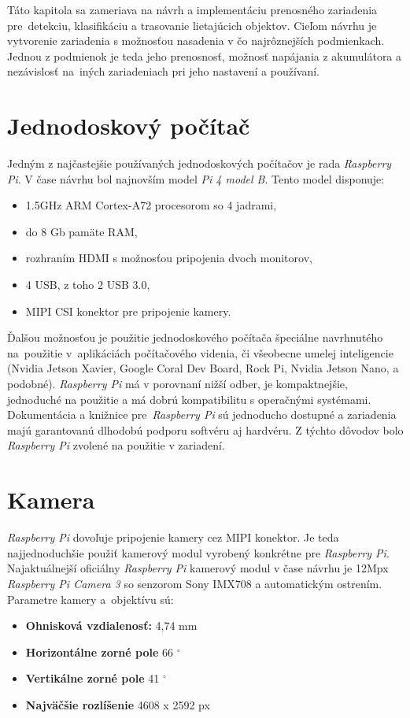     Táto kapitola sa zameriava na návrh a implementáciu prenosného zariadenia pre~detekciu, klasifikáciu a trasovanie lietajúcich objektov. Cieľom návrhu je vytvorenie zariadenia s možnosťou nasadenia v čo najrôznejších podmienkach. Jednou z podmienok je teda jeho prenosnosť, možnosť napájania z akumulátora a nezávislosť na~iných zariadeniach pri jeho nastavení a používaní.

    \section{Jednodoskový počítač}
    
        Jedným z najčastejšie používaných jednodoskových počítačov je rada \emph{Raspberry Pi}. V čase návrhu bol najnovším model \emph{Pi 4 model B}. Tento model disponuje:
        \begin{itemize}
            \item 1.5GHz ARM Cortex-A72 procesorom so 4 jadrami,
            \item do 8 Gb pamäte RAM,
            \item rozhraním HDMI s možnosťou pripojenia dvoch monitorov,
            \item 4 USB, z toho 2 USB 3.0,
            \item MIPI CSI konektor pre pripojenie kamery.
        \end{itemize}

        Ďalšou možnosťou je použitie jednodoskového počítača špeciálne navrhnutého na~použitie v~aplikáciách počítačového videnia, či všeobecne umelej inteligencie (Nvidia Jetson Xavier, Google Coral Dev Board, Rock Pi, Nvidia Jetson Nano, a podobné). \emph{Raspberry Pi} má v porovnaní nižší odber, je kompaktnejšie, jednoduché na použitie a má dobrú kompatibilitu s operačnými systémami. Dokumentácia a knižnice pre~\emph{Raspberry Pi} sú jednoducho dostupné a zariadenia majú garantovanú dlhodobú podporu softvéru aj hardvéru. Z týchto dôvodov bolo \emph{Raspberry Pi} zvolené na použitie v zariadení.

    \section{Kamera}

        \emph{Raspberry Pi} dovoľuje pripojenie kamery cez MIPI konektor. Je teda najjednoduchšie použiť kamerový modul vyrobený konkrétne pre \emph{Raspberry Pi}. Najaktuálnejší oficiálny \emph{Raspberry Pi} kamerový modul v čase návrhu je 12Mpx \emph{Raspberry Pi Camera 3} so senzorom Sony IMX708 a automatickým ostrením. Parametre kamery a~objektívu sú:
        \begin{itemize}
            \item \textbf{Ohnisková vzdialenosť:} 4,74 mm
            \item \textbf{Horizontálne zorné pole} 66 \(^\circ\)
            \item \textbf{Vertikálne zorné pole} 41 \(^\circ\)
            \item \textbf{Najväčšie rozlíšenie} 4608 x 2592 px
        \end{itemize}

